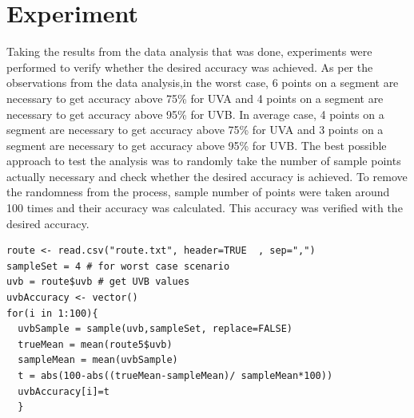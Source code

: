 \documentclass[12pt,fullpage,doublespace]{article}
\begin{document}
\section{Experiment}
Taking the results from the data analysis that was done, experiments were performed to verify whether the desired accuracy was achieved. As per the observations from the data analysis,in the worst case, 6 points on a segment are necessary to get accuracy above 75\% for UVA and 4 points on a segment are necessary to get accuracy above 95\% for UVB.
In average case, 4 points on a segment are necessary to get accuracy above 75\% for UVA and  3 points on a segment are necessary to get accuracy above 95\% for UVB. The best possible approach to test the analysis was to randomly take the number of sample points actually necessary and check whether the desired accuracy is achieved. To remove the randomness from the process, sample number of points were taken around 100 times and their accuracy was calculated. This accuracy was verified with the desired accuracy. 

\lstset{ tabsize=4,      caption=R Code for verifying accuracy,breaklines=true,
        frame=single}
\begin{lstlisting}
route <- read.csv("route.txt", header=TRUE  , sep=",")
sampleSet = 4 # for worst case scenario
uvb = route$uvb # get UVB values
uvbAccuracy <- vector()
for(i in 1:100){
  uvbSample = sample(uvb,sampleSet, replace=FALSE)
  trueMean = mean(route5$uvb)
  sampleMean = mean(uvbSample)
  t = abs(100-abs((trueMean-sampleMean)/ sampleMean*100))
  uvbAccuracy[i]=t
  }
\end{lstlisting}
\end{document}
